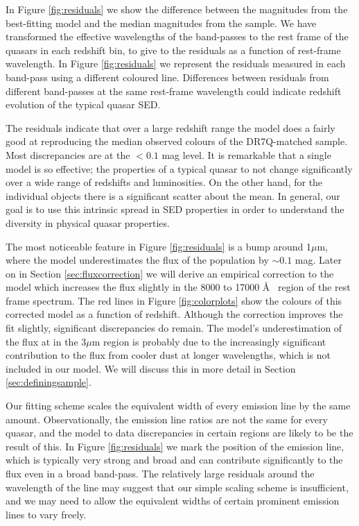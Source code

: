 In Figure \ref{fig:residuals} we show the difference between the magnitudes from the best-fitting model and the median magnitudes from the sample. 
We have transformed the effective wavelengths of the band-passes to the rest frame of the quasars in each redshift bin, to give to the residuals as a function of rest-frame wavelength. 
In Figure \ref{fig:residuals} we represent the residuals measured in each band-pass using a different coloured line. 
Differences between residuals from different band-passes at the same rest-frame wavelength could indicate redshift evolution of the typical quasar SED. 

The residuals indicate that over a large redshift range the model does a fairly good at reproducing the median observed colours of the DR7Q-matched sample. 
Most discrepancies are at the $<0.1$ mag level. 
It is remarkable that a single model is so effective; the properties of a typical quasar to not change significantly over a wide range of redshifts and luminosities. 
On the other hand, for the individual objects there is a significant scatter about the mean. 
In general, our goal is to use this intrinsic spread in SED properties in order to understand the diversity in physical quasar properties. 

The most noticeable feature in Figure \ref{fig:residuals} is a bump around 1$\mu$m, where the model underestimates the flux of the population by $\sim 0.1$ mag. 
Later on in Section \ref{sec:fluxcorrection} we will derive an empirical correction to the model which increases the flux slightly in the 8000 to 17000 \AA~ region of the rest frame spectrum. 
The red lines in Figure \ref{fig:colorplots} show the colours of this corrected model as a function of redshift. Although the correction improves the fit slightly, significant discrepancies do remain. 
The model's underestimation of the flux at in the 3$\mu$m region is probably due to the increasingly significant contribution to the flux from cooler dust at longer wavelengths, which is not included in our model. 
We will discuss this in more detail in Section \ref{sec:definingsample}. 

Our fitting scheme scales the equivalent width of every emission line by the same amount. 
Observationally, the emission line ratios are not the same for every quasar, and the model to data discrepancies in certain regions are likely to be the result of this. 
In Figure \ref{fig:residuals} we mark the position of the \ha emission line, which is typically very strong and broad and can contribute significantly to the flux even in a broad band-pass. 
The relatively large residuals around the wavelength of the \ha line may suggest that our simple scaling scheme is insufficient, and we may need to allow the equivalent widths of certain prominent emission lines to vary freely. 

